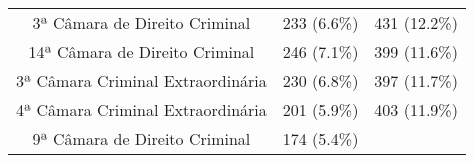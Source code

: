 \documentclass[10pt,]{article}
\begin{document}
\begin{longtable}[c]{@{}ccc@{}}
\begin{minipage}[t]{0.39\columnwidth}\centering\strut
3ª Câmara de Direito Criminal
\strut\end{minipage} &
\begin{minipage}[t]{0.16\columnwidth}\centering\strut
233 (6.6\%)
\strut\end{minipage} &
\begin{minipage}[t]{0.24\columnwidth}\centering\strut
431 (12.2\%)
\strut\end{minipage}\tabularnewline
\begin{minipage}[t]{0.39\columnwidth}\centering\strut
14ª Câmara de Direito Criminal
\strut\end{minipage} &
\begin{minipage}[t]{0.16\columnwidth}\centering\strut
246 (7.1\%)
\strut\end{minipage} &
\begin{minipage}[t]{0.24\columnwidth}\centering\strut
399 (11.6\%)
\strut\end{minipage}\tabularnewline
\begin{minipage}[t]{0.39\columnwidth}\centering\strut
3ª Câmara Criminal Extraordinária
\strut\end{minipage} &
\begin{minipage}[t]{0.16\columnwidth}\centering\strut
230 (6.8\%)
\strut\end{minipage} &
\begin{minipage}[t]{0.24\columnwidth}\centering\strut
397 (11.7\%)
\strut\end{minipage}\tabularnewline
\begin{minipage}[t]{0.39\columnwidth}\centering\strut
4ª Câmara Criminal Extraordinária
\strut\end{minipage} &
\begin{minipage}[t]{0.16\columnwidth}\centering\strut
201 (5.9\%)
\strut\end{minipage} &
\begin{minipage}[t]{0.24\columnwidth}\centering\strut
403 (11.9\%)
\strut\end{minipage}\tabularnewline
\begin{minipage}[t]{0.39\columnwidth}\centering\strut
9ª Câmara de Direito Criminal
\strut\end{minipage} &
\begin{minipage}[t]{0.16\columnwidth}\centering\strut
174 (5.4\%)
\strut\end{minipage} &
\begin{minipage}[t]{0.24\columnwidth}\centering\strut

\end{minipage}
\end{longtable}
\end{document}
